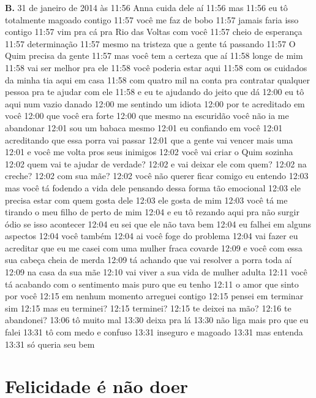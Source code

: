 \begin{flushleft}
\textbf{B.} 31 de janeiro de 2014 às 11:56
Anna cuida dele
aí 11:56 mas 11:56 eu tô totalmente magoado contigo 11:57 você me faz de
bobo 11:57 jamais faria isso contigo 11:57 vim pra cá pra Rio das Voltas
com você 11:57 cheio de esperança 11:57 determinação 11:57 mesmo na
tristeza que a gente tá passando 11:57 O Quim precisa da gente 11:57
mas você tem a certeza que aí 11:58 longe de mim 11:58 vai ser melhor
pra ele 11:58 você poderia estar aqui 11:58 com os cuidados da minha tia
aqui em casa 11:58 com quatro mil na conta pra contratar qualquer pessoa
pra te ajudar com ele 11:58 e eu te ajudando do jeito que dá 12:00 eu tô
aqui num vazio danado 12:00 me sentindo um idiota 12:00 por te
acreditado em você 12:00 que você era forte 12:00 que mesmo na escuridão
você não ia me abandonar 12:01 sou um babaca mesmo 12:01 eu confiando em
você 12:01 acreditando que essa porra vai passar 12:01 que a gente vai
vencer mais uma 12:01 e você me volta pros seus inimigos 12:02 você vai
criar o Quim sozinha 12:02 quem vai te ajudar de verdade? 12:02 e vai
deixar ele com quem? 12:02 na creche? 12:02 com sua mãe? 12:02 você não
querer ficar comigo eu entendo 12:03 mas você tá fodendo a vida dele
pensando dessa forma tão emocional 12:03 ele precisa estar com quem
gosta dele 12:03 ele gosta de mim 12:03 você tá me tirando o meu filho
de perto de mim 12:04 e eu tô rezando aqui pra não surgir ódio se isso
acontecer 12:04 eu sei que ele não tava bem 12:04 eu falhei em alguns
aspectos 12:04 você também 12:04 ai você foge do problema 12:04 vai
fazer eu acreditar que eu me casei com uma mulher fraca covarde 12:09 e
você com essa sua cabeça cheia de merda 12:09 tá achando que vai
resolver a porra toda aí 12:09 na casa da sua mãe 12:10 vai viver a sua
vida de mulher adulta 12:11 você tá acabando com o sentimento mais puro
que eu tenho 12:11 o amor que sinto por você 12:15 em nenhum momento
arreguei contigo 12:15 pensei em terminar sim 12:15 mas eu terminei?
12:15 terminei? 12:15 te deixei na mão? 12:16 te abandonei? 13:06 tô
muito mal 13:30 deixa pra lá 13:30 não liga mais pro que eu falei 13:31
tô com medo e confuso 13:31 inseguro e magoado 13:31 mas entenda 13:31
só queria seu bem

\end{flushleft}

\chapter{Felicidade é não doer}\label{felicidade-uxe9-nuxe3o-doer}

\begingroup %


